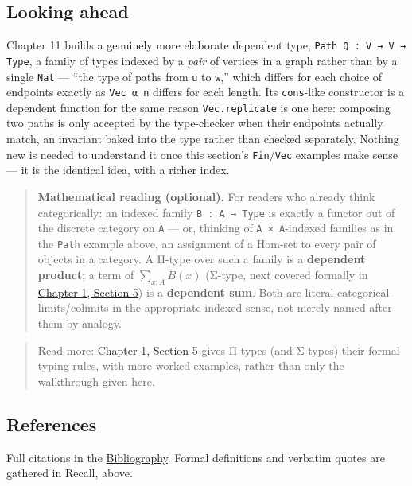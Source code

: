 \subsection{Looking ahead}\label{sec:01-basics:03-dependent-types:8}

Chapter 11 builds a genuinely more elaborate dependent type, \texttt{Path Q : V → V → Type}, a family of types indexed by a \emph{pair} of vertices in a graph rather than by a single \texttt{Nat} --- ``the type of paths from \texttt{u} to \texttt{w},'' which differs for each choice of endpoints exactly as \texttt{Vec α n} differs for each length. Its \texttt{cons}-like constructor is a dependent function for the same reason \texttt{Vec.replicate} is one here: composing two paths is only accepted by the type-checker when their endpoints actually match, an invariant baked into the type rather than checked separately. Nothing new is needed to understand it once this section's \texttt{Fin}/\texttt{Vec} examples make sense --- it is the identical idea, with a richer index.

\begin{quote}
\textbf{Mathematical reading (optional).} For readers who already think categorically: an indexed family \texttt{B : A → Type} is exactly a functor out of the discrete category on \texttt{A} --- or, thinking of \texttt{A × A}-indexed families as in the \texttt{Path} example above, an assignment of a \(\mathrm{Hom}\)-set to every pair of objects in a category. A Π-type over such a family is a \textbf{dependent product}; a term of \(\sum_{x:A} B(x)\) (Σ-type, next covered formally in \hyperref[sec:01-basics:05-pi-sigma-and-coc:1]{Chapter 1, Section 5}) is a \textbf{dependent sum}. Both are literal categorical limits/colimits in the appropriate indexed sense, not merely named after them by analogy.
\end{quote}

\begin{quote}
Read more: \hyperref[sec:01-basics:05-pi-sigma-and-coc:1]{Chapter 1, Section 5} gives Π-types (and Σ-types) their formal typing rules, with more worked examples, rather than only the walkthrough given here.
\end{quote}

\subsection{References}\label{sec:01-basics:03-dependent-types:9}

Full citations in the \hyperref[sec:root:bibliography:1]{Bibliography}. Formal definitions and verbatim quotes are gathered in Recall, above.


